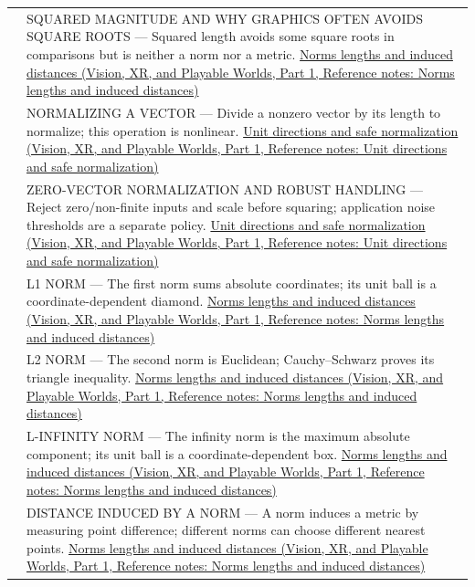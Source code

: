 {\begin{longtable}[]{@{}
  >{\raggedright\arraybackslash}p{}
  >{\raggedright\arraybackslash}p{}@{}}
527 & SQUARED MAGNITUDE AND WHY GRAPHICS OFTEN AVOIDS SQUARE ROOTS --- Squared length avoids some square roots in comparisons but is neither a norm nor a metric. \href{../07-Vision-XR-and-Playable-Worlds-P01/main.pdf\#appendix-49933872bb51}{Norms lengths and induced distances (Vision, XR, and Playable Worlds, Part 1, Reference notes: Norms lengths and induced distances)} \\
528 & NORMALIZING A VECTOR --- Divide a nonzero vector by its length to normalize; this operation is nonlinear. \href{../07-Vision-XR-and-Playable-Worlds-P01/main.pdf\#appendix-f744e41b95b4}{Unit directions and safe normalization (Vision, XR, and Playable Worlds, Part 1, Reference notes: Unit directions and safe normalization)} \\
529 & ZERO-VECTOR NORMALIZATION AND ROBUST HANDLING --- Reject zero/non-finite inputs and scale before squaring; application noise thresholds are a separate policy. \href{../07-Vision-XR-and-Playable-Worlds-P01/main.pdf\#appendix-f744e41b95b4}{Unit directions and safe normalization (Vision, XR, and Playable Worlds, Part 1, Reference notes: Unit directions and safe normalization)} \\
530 & L1 NORM --- The first norm sums absolute coordinates; its unit ball is a coordinate-dependent diamond. \href{../07-Vision-XR-and-Playable-Worlds-P01/main.pdf\#appendix-49933872bb51}{Norms lengths and induced distances (Vision, XR, and Playable Worlds, Part 1, Reference notes: Norms lengths and induced distances)} \\
531 & L2 NORM --- The second norm is Euclidean; Cauchy--Schwarz proves its triangle inequality. \href{../07-Vision-XR-and-Playable-Worlds-P01/main.pdf\#appendix-49933872bb51}{Norms lengths and induced distances (Vision, XR, and Playable Worlds, Part 1, Reference notes: Norms lengths and induced distances)} \\
532 & L-INFINITY NORM --- The infinity norm is the maximum absolute component; its unit ball is a coordinate-dependent box. \href{../07-Vision-XR-and-Playable-Worlds-P01/main.pdf\#appendix-49933872bb51}{Norms lengths and induced distances (Vision, XR, and Playable Worlds, Part 1, Reference notes: Norms lengths and induced distances)} \\
533 & DISTANCE INDUCED BY A NORM --- A norm induces a metric by measuring point difference; different norms can choose different nearest points. \href{../07-Vision-XR-and-Playable-Worlds-P01/main.pdf\#appendix-49933872bb51}{Norms lengths and induced distances (Vision, XR, and Playable Worlds, Part 1, Reference notes: Norms lengths and induced distances)} \\

\end{longtable}}
